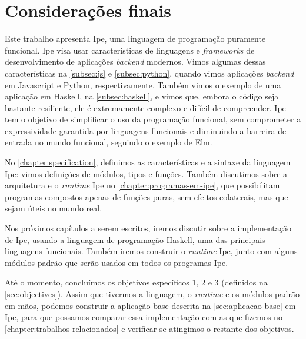 
\chapter{Considerações finais}

Este trabalho apresenta Ipe, uma linguagem de programação puramente funcional.
Ipe visa usar características de linguagens e \textit{frameworks} de desenvolvimento
de aplicações \textit{backend} modernos. Vimos algumas dessas características na
\autoref{subsec:js} e \autoref{subsec:python}, quando vimos aplicações \textit{backend}
em Javascript e Python, respectivamente. Também vimos o exemplo de uma aplicação
em Haskell, na \autoref{subsec:haskell}, e vimos que, embora o código seja bastante
resiliente, ele é extremamente complexo e difícil de compreender. Ipe tem o objetivo
de simplificar o uso da programação funcional, sem comprometer a expressividade
garantida por linguagens funcionais e diminuindo a barreira de entrada no mundo
funcional, seguindo o exemplo de Elm.

No \autoref{chapter:specification}, definimos as características e a sintaxe da
linguagem Ipe: vimos definições de módulos, tipos e funções. Também discutimos
sobre a arquitetura e o \textit{runtime} Ipe no \autoref{chapter:programas-em-ipe},
que possibilitam programas compostos apenas de funções puras, sem efeitos colaterais,
mas que sejam úteis no mundo real.

Nos próximos capítulos a serem escritos, iremos discutir sobre a implementação
de Ipe, usando a linguagem de programação Haskell, uma das principais linguagens
funcionais. Também iremos construir o \textit{runtime} Ipe, junto com alguns módulos
padrão que serão usados em todos os programas Ipe.

Até o momento, concluímos os objetivos específicos 1, 2 e 3 (definidos na
\autoref{sec:objectives}). Assim que tivermos a linguagem, o \textit{runtime} e
os módulos padrão em mãos, podemos construir a aplicação base descrita na
\autoref{sec:aplicacao-base} em Ipe, para que possamos comparar essa implementação
com as que fizemos no \autoref{chapter:trabalhos-relacionados} e verificar se
atingimos o restante dos objetivos.
